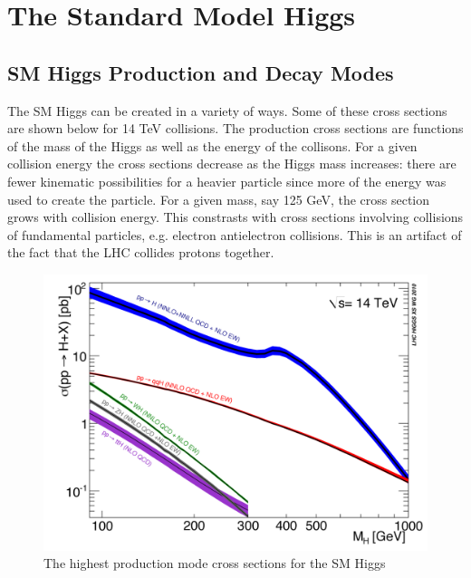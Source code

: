 \section{The Standard Model Higgs}


\subsection{SM Higgs Production and Decay Modes}

The SM Higgs can be created in a variety of ways. Some of these cross sections are shown below for 14 TeV collisions. The production cross sections are functions of the mass of the Higgs as well as the energy of the collisons. For a given collision energy the cross sections decrease as the Higgs mass increases: there are fewer kinematic possibilities for a heavier particle since more of the energy was used to create the particle. For a given mass, say 125 GeV, the cross section grows with collision energy. This constrasts with cross sections involving collisions of fundamental particles, e.g. electron antielectron collisions. This is an artifact of the fact that the LHC collides protons together. 

\begin{figure}[h!]
  \centering
  \includegraphics[width=5in]{images/14TeV_higgs_cross_sections.png}
  \caption
   {The highest production mode cross sections for the SM Higgs \cite{crossbranchplots}}
  \label{fig:hprodcross}
\end{figure}

